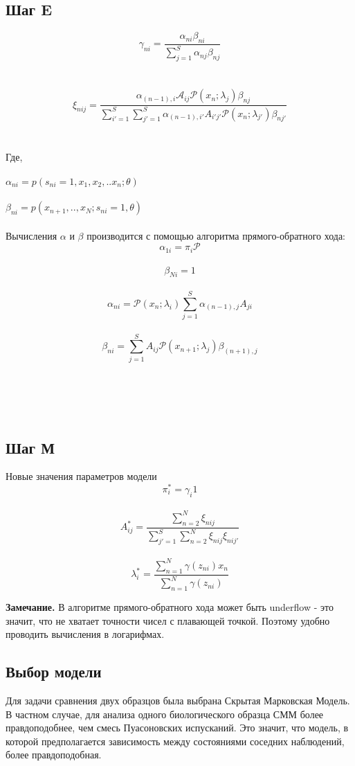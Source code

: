 \documentclass{matmex-diploma}
\begin{document}
\subsection*{Шаг E}
$$\gamma_{ni}=\frac{\alpha_{ni}\beta_{ni}}{\sum_{j=1}^S\alpha_{nj}\beta_{nj}}$$
\\\\
$$\xi_{nij}=\frac{\alpha_{(n-1),i}\mathcal{A}_{ij}\mathcal{P}(x_n;\lambda_j)\beta_{nj}}{\sum_{i'=1}^S\sum_{j'=1}^S\alpha_{(n-1),i'}A_{i'j'}\mathcal{P}(x_n;\lambda_{j'})\beta_{nj'}}$$
\\\\
Где, 
\\\\
$\alpha_{ni}=p(s_{ni}=1,x_1,x_2,..x_n;\theta)$
\\\\
$\beta_{ni}=p(x_{n+1}, ..,x_N; s_{ni}=1,\theta)$
\\\\
Вычисления $\alpha$ и $\beta$ производится с помощью алгоритма прямого-обратного хода:
\\
$$\alpha_{1i}=\pi_i\mathcal{P}$$
\\
$$\beta_{Ni}=1$$
\\
$$\alpha_{ni}=\mathcal{P}(x_n;\lambda_i)\sum_{j=1}^S\alpha_{(n-1),j}A_{ji}$$
\\
$$\beta_{ni}=\sum_{j=1}^S A_{ij}\mathcal{P}(x_{n+1};\lambda_j)\beta_{(n+1),j}$$
\\\\
\\\\
\subsection*{Шаг М}
Новые значения параметров модели
$$\pi_i^*=\gamma_i1$$
\\
$$A_{ij}^*=\frac{\sum_{n=2}^N\xi_{nij}}{\sum_{j'=1}^S\sum_{n=2}^N\xi_{nij}\xi_{nij'}}$$
\\
$$\lambda_i^* = \frac{\sum_{n=1}^N\gamma(z_{ni})x_n}{\sum_{n=1}^N\gamma(z_{ni})}$$

\textbf{Замечание.} В алгоритме прямого-обратного хода может быть underflow - это значит, что не хватает точности чисел с плавающей точкой.
Поэтому удобно проводить вычисления в логарифмах.

\subsection{Выбор модели}
Для задачи сравнения двух образцов была выбрана Скрытая Марковская Модель.
В частном случае, для анализа одного биологического образца СММ более правдоподобнее, чем смесь Пуасоновских испусканий.
Это значит, что модель, в которой предполагается зависимость между состояниями соседних наблюдений, более правдоподобная.
\end{document}
